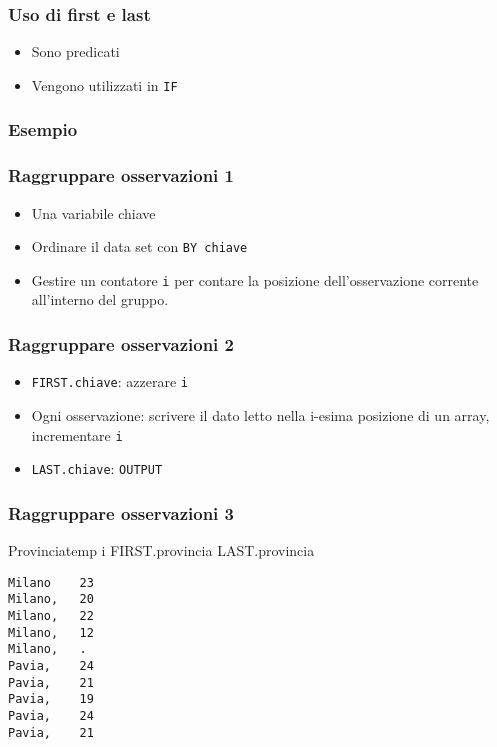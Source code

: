 \begin{frame}\frametitle{Uso di first  e last}
  \begin{itemize}
  \item
    Sono predicati
  \item
    Vengono utilizzati in \texttt{IF}
  \end{itemize}\end{frame}

\begin{frame}[containsverbatim]\frametitle{Esempio}
\end{frame}



\begin{frame}\frametitle{Raggruppare osservazioni 1}
  \begin{itemize}
  \item
    Una variabile \alert{chiave}
  \item
    Ordinare il data set con \texttt{BY chiave}
  \item
    Gestire un contatore \texttt{i} per contare la posizione dell'osservazione
    corrente all'interno del gruppo.
  \end{itemize}\end{frame}


\begin{frame}\frametitle{Raggruppare osservazioni 2}
  \begin{itemize}
  \item
    \texttt{FIRST.chiave}: azzerare  \texttt{i}
  \item
    Ogni osservazione: scrivere il dato letto nella i-esima posizione di un array,
    incrementare  \texttt{i}
  \item
    \texttt{LAST.chiave}: \texttt{OUTPUT}
  \end{itemize}\end{frame}


\begin{frame}[containsverbatim]\frametitle{Raggruppare osservazioni 3}
  \small
  Provincia\hspace{2ex}temp\hspace{1ex} i\hspace{1ex} FIRST.provincia\hspace{1ex} LAST.provincia
\begin{verbatim}
Milano    23
Milano,   20
Milano,   22
Milano,   12
Milano,   .
Pavia,    24
Pavia,    21
Pavia,    19
Pavia,    24
Pavia,    21
\end{verbatim}
\end{frame}

